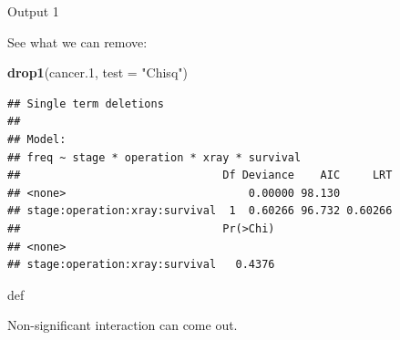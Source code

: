 \documentclass[ignorenonframetext,]{beamer}
\newenvironment{Shaded}{\begin{snugshade}}{\end{snugshade}}
\newcommand{\DataTypeTok}[1]{\textcolor[rgb]{0.13,0.29,0.53}{#1}}
\newcommand{\FloatTok}[1]{\textcolor[rgb]{0.00,0.00,0.81}{#1}}
\newcommand{\KeywordTok}[1]{\textcolor[rgb]{0.13,0.29,0.53}{\textbf{#1}}}
\newcommand{\NormalTok}[1]{#1}
\newcommand{\StringTok}[1]{\textcolor[rgb]{0.31,0.60,0.02}{#1}}
\begin{document}
\begin{frame}[fragile]{Output 1}
\protect\hypertarget{output-1-1}{}

See what we can remove:

\begin{Shaded}
\begin{Highlighting}[]
\KeywordTok{drop1}\NormalTok{(cancer}\FloatTok{.1}\NormalTok{, }\DataTypeTok{test =} \StringTok{"Chisq"}\NormalTok{)}
\end{Highlighting}
\end{Shaded}

\begin{verbatim}
## Single term deletions
## 
## Model:
## freq ~ stage * operation * xray * survival
##                               Df Deviance    AIC     LRT
## <none>                            0.00000 98.130        
## stage:operation:xray:survival  1  0.60266 96.732 0.60266
##                               Pr(>Chi)
## <none>                                
## stage:operation:xray:survival   0.4376
\end{verbatim}

def

Non-significant interaction can come out.

\end{frame}
\end{document}
